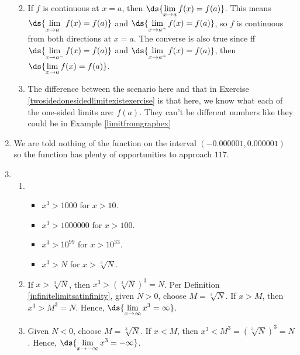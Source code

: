 \documentclass{ximera}
\begin{document}
\begin{enumerate}
\begin{enumerate}
\smallskip

\item If $f$ is continuous at $x=a$, then $\ds{\lim_{x \rightarrow a} f(x) = f(a)}$.  This means  $\ds{\lim_{x \rightarrow a^{-}} f(x) = f(a)}$ and  $\ds{\lim_{x \rightarrow a^{+}} f(x) = f(a)}$, so $f$ is continuous from both directions at $x=a$. The converse is also true since  ff $\ds{\lim_{x \rightarrow a^{-}} f(x) = f(a)}$ and  $\ds{\lim_{x \rightarrow a^{+}} f(x) = f(a)}$, then $\ds{\lim_{x \rightarrow a} f(x) = f(a)}$.

\smallskip

\item  The difference between the scenario here and that in Exercise \ref{twosidedonesidedlimitexistexercise} is that here, we know what each of the one-sided limits are: $f(a)$. They can't be different numbers like they could be in  Example \ref{limitfromgraphex}

\smallskip

\end{enumerate}


\item  We are told nothing of the function on the interval $(-0.000001, 0.000001 )$ so the function has plenty of opportunities to approach $117$.  


\item \begin{enumerate}

\item \begin{itemize} \item  $x^3 > 1000$ for $x > 10$.

\item  $x^3 > 1000000$ for $x > 100$.

\item  $x^3 > 10^{99}$ for $x > 10^{33}$.

\item  $x^3 > N$ for $x > \sqrt[3]{N}$.

\end{itemize}


\item If $x > \sqrt[3]{N}$, then $x^3 > \left(\sqrt[3]{N} \right)^3 = N$.  Per  Definition \ref{infinitelimitsatinfinity}, given $N>0$, choose $M = \sqrt[3]{N}$.  If $x > M$, then $x^3 > M^3 = N$. Hence,  $\ds{\lim_{x \rightarrow \infty} x^3 = \infty}$.

\smallskip

\item Given $N<0$, choose $M = \sqrt[3]{N}$.  If $x< M$, then $x^3 < M^3 = \left(\sqrt[3]{N}\right)^3 = N$.  Hence,   $\ds{\lim_{x \rightarrow -\infty} x^3 = -\infty}$.

\end{enumerate}
 
\end{enumerate}
\end{document}

